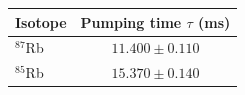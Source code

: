 \begin{tabular}{lc}
  \hline
  Isotope & Pumping time $\tau$ (ms) \\
  \hline
  $^{87}$Rb & $11.400 \pm 0.110$ \\
  $^{85}$Rb & $15.370 \pm 0.140$ \\
  \hline
\end{tabular}